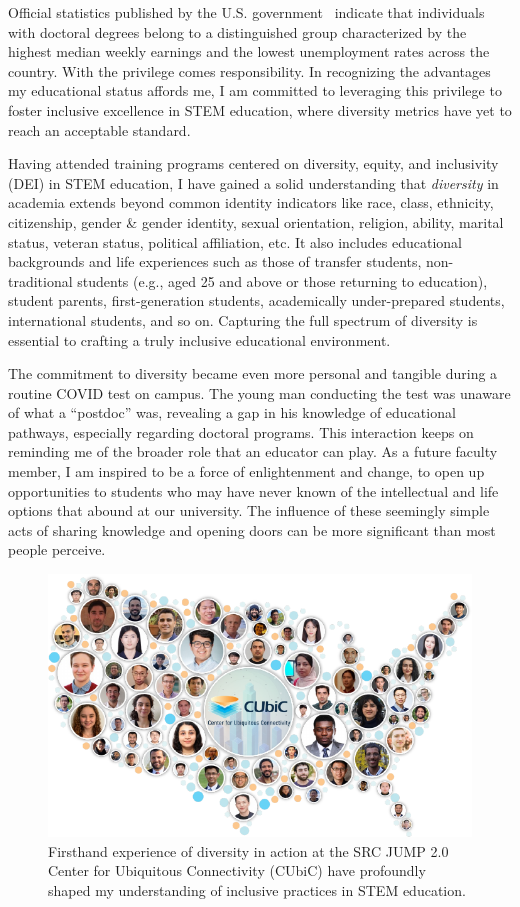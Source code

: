 Official statistics published by the U.S. government~\cite{EducationPaysBureau} indicate that individuals with doctoral degrees belong to a distinguished group characterized by the highest median weekly earnings and the lowest unemployment rates across the country. With the privilege comes responsibility. In recognizing the advantages my educational status affords me, I am committed to leveraging this privilege to foster inclusive excellence in STEM education, where diversity metrics have yet to reach an acceptable standard.

Having attended training programs centered on diversity, equity, and inclusivity (DEI) in STEM education, I have gained a solid understanding that \emph{diversity} in academia extends beyond common identity indicators like race, class, ethnicity, citizenship, gender \& gender identity, sexual orientation, religion, ability, marital status, veteran status, political affiliation, etc. It also includes educational backgrounds and life experiences such as those of transfer students, non-traditional students (e.g., aged 25 and above or those returning to education), student parents, first-generation students, academically under-prepared students, international students, and so on. Capturing the full spectrum of diversity is essential to crafting a truly inclusive educational environment.

The commitment to diversity became even more personal and tangible during a routine COVID test on campus. The young man conducting the test was unaware of what a ``postdoc'' was, revealing a gap in his knowledge of educational pathways, especially regarding doctoral programs. This interaction keeps on reminding me of the broader role that an educator can play. As a future faculty member, I am inspired to be a force of enlightenment and change, to open up opportunities to students who may have never known of the intellectual and life options that abound at our university. The influence of these seemingly simple acts of sharing knowledge and opening doors can be more significant than most people perceive.

\begin{figure}[!ht]
    \centering
    \includegraphics[width=0.6\linewidth]{../../fig/diversity.pdf}
    \caption{Firsthand experience of diversity in action at the SRC JUMP 2.0 Center for Ubiquitous Connectivity (CUbiC) have profoundly shaped my understanding of inclusive practices in STEM education.}
    \label{fig:diversity}
\end{figure}

